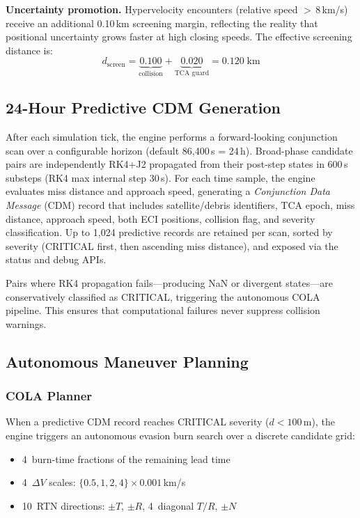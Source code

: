 \documentclass[10pt,twocolumn,letterpaper]{article}
\begin{document}
\noindent
\textbf{Uncertainty promotion.}  Hypervelocity encounters (relative speed
$>$\,8\,km/s) receive an additional 0.10\,km screening margin, reflecting
the reality that positional uncertainty grows faster at high closing
speeds.  The effective screening distance is:
%
\begin{equation}
  d_{\text{screen}} = \underbrace{0.100}_{\text{collision}} +
                      \underbrace{0.020}_{\text{TCA guard}} = 0.120 \;\text{km}
\end{equation}

\subsection{24-Hour Predictive CDM Generation}

After each simulation tick, the engine performs a forward-looking
conjunction scan over a configurable horizon (default 86{,}400\,s = 24\,h).
Broad-phase candidate pairs are independently RK4+J2 propagated from their
post-step states in 600\,s substeps (RK4 max internal step 30\,s).  For each
time sample, the engine evaluates miss distance and approach speed, generating
a \emph{Conjunction Data Message} (CDM) record that includes satellite/debris
identifiers, TCA epoch, miss distance, approach speed, both ECI positions,
collision flag, and severity classification.  Up to 1{,}024 predictive
records are retained per scan, sorted by severity (CRITICAL first, then
ascending miss distance), and exposed via the status and debug APIs.

Pairs where RK4 propagation fails---producing NaN or divergent states---are
conservatively classified as CRITICAL, triggering the autonomous COLA
pipeline.  This ensures that computational failures never suppress
collision warnings.

\subsection{Autonomous Maneuver Planning}

\subsubsection{COLA Planner}

When a predictive CDM record reaches CRITICAL severity ($d < 100$\,m),
the engine triggers an autonomous evasion burn search over a discrete
candidate grid:

\begin{itemize}[nosep,leftmargin=*]
  \item 4~burn-time fractions of the remaining lead time
  \item 4~$\Delta V$ scales: $\{0.5, 1, 2, 4\} \times 0.001$\,km/s
  \item 10~RTN directions: $\pm T$, $\pm R$, 4~diagonal $T/R$, $\pm N$
\end{itemize}
\end{document}
